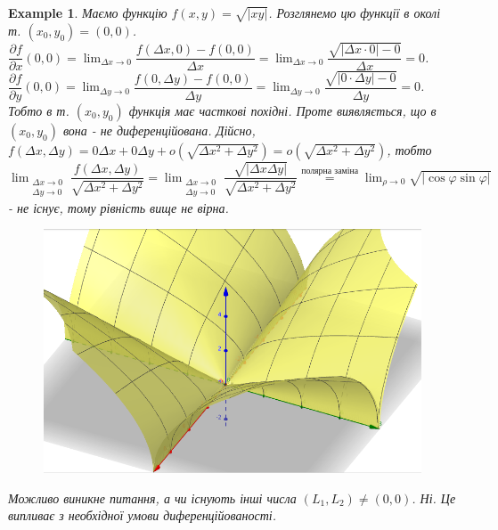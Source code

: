 \documentclass[a4paper, 10pt]{article}
\def\departial#1#2{\dfrac{\partial {#1}}{\partial {#2}}}
\def\huge{\displaystyle}
\theoremstyle{theoremdd}
\theoremstyle{theoremdd}
\theoremstyle{theoremdd}
\theoremstyle{theoremdd}
\newtheorem{example}[theorem]{Example}
\theoremstyle{theoremdd}
\theoremstyle{theoremdd}
\theoremstyle{theoremdd}
\theoremstyle{theoremdd}
\begin{document}
\begin{example}
Маємо функцію $f(x,y) = \sqrt{|xy|}$. Розглянемо цю функції в околі т. $(x_0,y_0) = (0,0)$.\\
$\departial{f}{x}(0,0) = \huge\lim_{\Delta x \to 0} \dfrac{f(\Delta x,0) - f(0,0)}{\Delta x} = \lim_{\Delta x \to 0} \dfrac{\sqrt{|\Delta x \cdot 0| - 0}}{\Delta x} = 0$.\\
$\departial{f}{y}(0,0) = \huge\lim_{\Delta y \to 0} \dfrac{f(0,\Delta y) - f(0,0)}{\Delta y} = \lim_{\Delta y \to 0} \dfrac{\sqrt{|0 \cdot \Delta y| - 0}}{\Delta y} = 0$.\\
Тобто в т. $(x_0,y_0)$ функція має часткові похідні. Проте виявляється, що в $(x_0,y_0)$ вона - не диференційована. Дійсно,\\
$f(\Delta x,\Delta y) = 0 \Delta x + 0 \Delta y + o(\sqrt{\Delta x^2 + \Delta y^2}) = o(\sqrt{\Delta x^2 + \Delta y^2})$, тобто\\
$\huge\lim_{\substack{\Delta x \to 0 \\ \Delta y \to 0}} \dfrac{f(\Delta x,\Delta y)}{\sqrt{\Delta x^2 + \Delta y^2}} = \lim_{\substack{\Delta x \to 0 \\ \Delta y \to 0}} \dfrac{\sqrt{|\Delta x \Delta y|}}{\sqrt{\Delta x^2 + \Delta y^2}} \overset{\text{полярна заміна}}{=} \lim_{\rho \to 0} \sqrt{|\cos \varphi \sin \varphi|}$ - не існує, тому рівність вище не вірна.
\begin{figure}[H]
\centering
\includegraphics[scale=0.24]{not_differentiable.png}
\end{figure}
Можливо виникне питання, а чи існують інші числа $(L_1,L_2) \neq (0,0)$. Ні. Це випливає з необхідної умови диференційованості.
\end{example}
\end{document}
